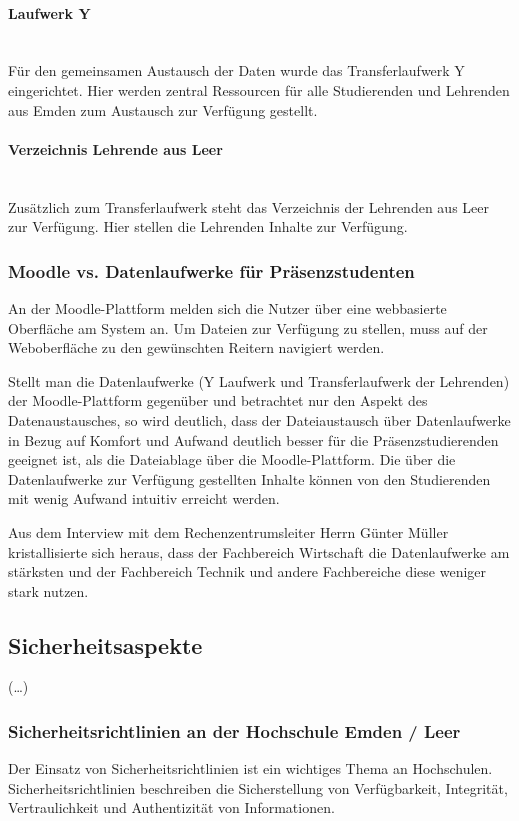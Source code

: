 \paragraph{Laufwerk Y}\mbox{} \\
Für den gemeinsamen Austausch der Daten wurde das Transferlaufwerk Y eingerichtet. Hier werden zentral Ressourcen für alle Studierenden und Lehrenden aus Emden zum Austausch zur Verfügung gestellt.

\paragraph{Verzeichnis Lehrende aus Leer}\mbox{} \\
Zusätzlich zum Transferlaufwerk steht das Verzeichnis der Lehrenden aus Leer  zur Verfügung. Hier stellen die Lehrenden Inhalte zur Verfügung.

\subsubsection{Moodle vs. Datenlaufwerke für Präsenzstudenten}
An der Moodle-Plattform melden sich die Nutzer über eine webbasierte Oberfläche am System an. Um Dateien zur Verfügung zu stellen, muss auf der Weboberfläche zu den gewünschten Reitern navigiert werden.

Stellt man die Datenlaufwerke (Y Laufwerk und Transferlaufwerk der Lehrenden) der Moodle-Plattform gegenüber  und betrachtet nur den Aspekt des Datenaustausches, so wird deutlich, dass der Dateiaustausch über   Datenlaufwerke in Bezug auf Komfort und Aufwand deutlich besser für die Präsenzstudierenden geeignet ist, als die Dateiablage über die Moodle-Plattform. Die über die Datenlaufwerke zur Verfügung gestellten Inhalte können von den Studierenden mit wenig Aufwand intuitiv erreicht werden.

Aus dem Interview mit dem Rechenzentrumsleiter Herrn Günter Müller kristallisierte sich heraus, dass der Fachbereich Wirtschaft die Datenlaufwerke am stärksten und der Fachbereich Technik und andere Fachbereiche diese weniger stark nutzen.

\subsection{Sicherheitsaspekte}
(\ldots)

\subsubsection{Sicherheitsrichtlinien an der Hochschule Emden / Leer}
Der Einsatz von Sicherheitsrichtlinien ist ein wichtiges Thema an Hochschulen. Sicherheitsrichtlinien beschreiben die Sicherstellung von Verfügbarkeit, Integrität, Vertraulichkeit und Authentizität von Informationen.

